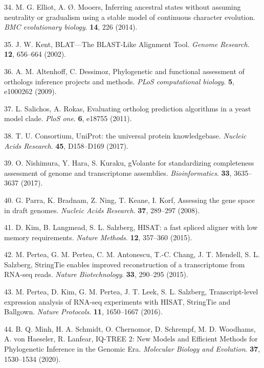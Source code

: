 \documentclass[]{elsarticle} %
\begin{document}
\leavevmode\hypertarget{ref-ElliotAndMooers2014}{}%
34. M. G. Elliot, A. Ø. Mooers, Inferring ancestral states without assuming neutrality or gradualism using a stable model of continuous character evolution. \emph{BMC evolutionary biology}. \textbf{14}, 226 (2014).

\leavevmode\hypertarget{ref-blat}{}%
35. J. W. Kent, BLAT---The BLAST-Like Alignment Tool. \emph{Genome Research}. \textbf{12}, 656--664 (2002).

\leavevmode\hypertarget{ref-AltenhoffAndDessimoz2009}{}%
36. A. M. Altenhoff, C. Dessimoz, Phylogenetic and functional assessment of orthologs inference projects and methods. \emph{PLoS computational biology}. \textbf{5}, e1000262 (2009).

\leavevmode\hypertarget{ref-SalichosAndRokas2011}{}%
37. L. Salichos, A. Rokas, Evaluating ortholog prediction algorithms in a yeast model clade. \emph{PloS one}. \textbf{6}, e18755 (2011).

\leavevmode\hypertarget{ref-uniprot}{}%
38. T. U. Consortium, UniProt: the universal protein knowledgebase. \emph{Nucleic Acids Research}. \textbf{45}, D158--D169 (2017).

\leavevmode\hypertarget{ref-gVolante}{}%
39. O. Nishimura, Y. Hara, S. Kuraku, gVolante for standardizing completeness assessment of genome and transcriptome assemblies. \emph{Bioinformatics}. \textbf{33}, 3635--3637 (2017).

\leavevmode\hypertarget{ref-CEGMA}{}%
40. G. Parra, K. Bradnam, Z. Ning, T. Keane, I. Korf, Assessing the gene space in draft genomes. \emph{Nucleic Acids Research}. \textbf{37}, 289--297 (2008).

\leavevmode\hypertarget{ref-HISAT}{}%
41. D. Kim, B. Langmead, S. L. Salzberg, HISAT: a fast spliced aligner with low memory requirements. \emph{Nature Methods}. \textbf{12}, 357--360 (2015).

\leavevmode\hypertarget{ref-StringTie}{}%
42. M. Pertea, G. M. Pertea, C. M. Antonescu, T.-C. Chang, J. T. Mendell, S. L. Salzberg, StringTie enables improved reconstruction of a transcriptome from RNA-seq reads. \emph{Nature Biotechnology}. \textbf{33}, 290--295 (2015).

\leavevmode\hypertarget{ref-Tuxedo}{}%
43. M. Pertea, D. Kim, G. M. Pertea, J. T. Leek, S. L. Salzberg, Transcript-level expression analysis of RNA-seq experiments with HISAT, StringTie and Ballgown. \emph{Nature Protocols}. \textbf{11}, 1650--1667 (2016).

\leavevmode\hypertarget{ref-IQTREE}{}%
44. B. Q. Minh, H. A. Schmidt, O. Chernomor, D. Schrempf, M. D. Woodhams, A. von Haeseler, R. Lanfear, IQ-TREE 2: New Models and Efficient Methods for Phylogenetic Inference in the Genomic Era. \emph{Molecular Biology and Evolution}. \textbf{37}, 1530--1534 (2020).
\end{document}
